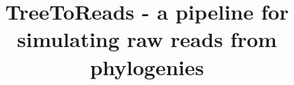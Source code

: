 \documentclass{bmcart}
\begin{document}
\begin{frontmatter}

\begin{fmbox}


\title{TreeToReads - a pipeline for simulating raw reads from phylogenies}


\author[
   addressref={aff1, aff2},                   %
   corref={aff1},                       %
  email={ejmctavish@ucmerced.edu}   %
]{ }
\author[
   addressref={aff3},
]{ }
\author[
   addressref={aff3},
]{ }
\author[
   addressref={aff3},
]{ }
\author[
   addressref={aff3},
]{ }
\author[
   addressref={aff3},
]{ }

\address[id=aff1]{%
  , %
  ,                              %
  ,
}


\end{fmbox}
\end{frontmatter}
\end{document}
